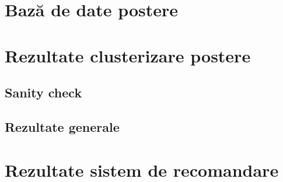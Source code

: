 \section{Bază de date postere}

\section{Rezultate clusterizare postere}

\subsection{Sanity check}

\subsection{Rezultate generale}

\section{Rezultate sistem de recomandare}
